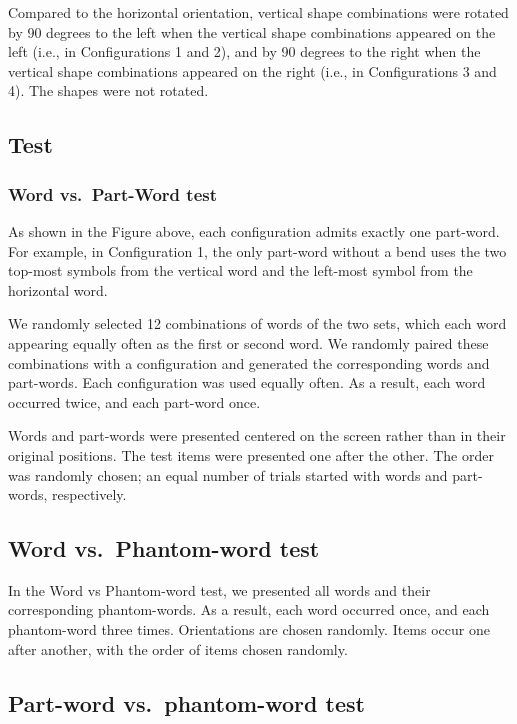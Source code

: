 \documentclass[
]{article}
\begin{document}
Compared to the horizontal orientation, vertical shape combinations were
rotated by 90 degrees to the left when the vertical shape combinations
appeared on the left (i.e., in Configurations 1 and 2), and by 90
degrees to the right when the vertical shape combinations appeared on
the right (i.e., in Configurations 3 and 4). The shapes were not
rotated.

\hypertarget{test}{%
\subsection{Test}\label{test}}

\hypertarget{word-vs.-part-word-test}{%
\subsubsection{Word vs.~Part-Word test}\label{word-vs.-part-word-test}}

As shown in the Figure above, each configuration admits exactly one
part-word. For example, in Configuration 1, the only part-word without a
bend uses the two top-most symbols from the vertical word and the
left-most symbol from the horizontal word.

We randomly selected 12 combinations of words of the two sets, which
each word appearing equally often as the first or second word. We
randomly paired these combinations with a configuration and generated
the corresponding words and part-words. Each configuration was used
equally often. As a result, each word occurred twice, and each part-word
once.

Words and part-words were presented centered on the screen rather than
in their original positions. The test items were presented one after the
other. The order was randomly chosen; an equal number of trials started
with words and part-words, respectively.

\hypertarget{word-vs.-phantom-word-test}{%
\subsection{Word vs.~Phantom-word
test}\label{word-vs.-phantom-word-test}}

In the Word vs Phantom-word test, we presented all words and their
corresponding phantom-words. As a result, each word occurred once, and
each phantom-word three times. Orientations are chosen randomly. Items
occur one after another, with the order of items chosen randomly.

\hypertarget{part-word-vs.-phantom-word-test}{%
\subsection{Part-word vs.~phantom-word
test}\label{part-word-vs.-phantom-word-test}}
\end{document}
